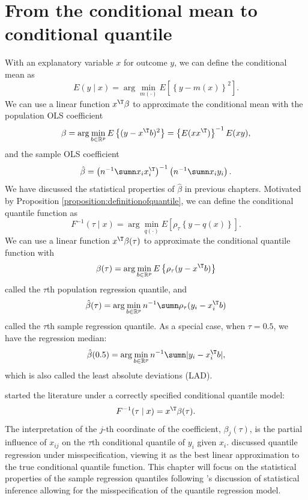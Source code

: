 \section{From the conditional mean to conditional quantile}

With an explanatory variable $x$ for outcome $y$, we can define
the conditional mean as
\[
E(y\mid x)=\arg\min_{m(\cdot)}E\left[\left\{ y-m(x)\right\} ^{2}\right].
\]
We can use a linear function $x^{\T}\beta$ to approximate the conditional
mean with the population OLS coefficient 
\[
\beta=\arg\min_{b \in \mathbb{R}^p  }E\left\{ (y-x^{\T}b)^{2}\right\} =\left\{ E(xx^{\T})\right\} ^{-1}E(xy),
\]
and the sample OLS coefficient
\[
\hat{\beta}=\left(n^{-1}\sumn x_{i}x_{i}^{\T}\right)^{-1}\left(n^{-1}\sumn x_{i}y_{i}\right).
\]
We have discussed the statistical properties of $\hat{\beta}$ in previous chapters.
Motivated by Proposition \ref{proposition:definitionofquantile}, we can
define the conditional quantile function as 
\[
F^{-1}(\tau\mid x)=\arg\min_{q(\cdot)}E\left[\rho_{\tau}\left\{ y-q(x)\right\} \right].
\]
We can use a linear function $x^{\T}\beta(\tau)$ to approximate the
conditional quantile function with
\[
\beta(\tau)=\arg\min_{b   \in \mathbb{R}^p  }E\left\{ \rho_{\tau}(y-x^{\T}b)\right\} 
\]
called the $\tau$th population regression quantile, and 
\begin{equation}
\hat{\beta}(\tau)=\arg\min_{b   \in \mathbb{R}^p }n^{-1}\sumn\rho_{\tau}(y_{i}-x_{i}^{\T}b)\label{eq:sample-regression-quantiles}
\end{equation}
called the $\tau$th sample regression quantile. 
As a special case, when $\tau = 0.5$, we have the regression median:
\[
\hat{\beta}(0.5)=\arg\min_{b  \in \mathbb{R}^p  } n^{-1}\sumn |y_{i}-x_{i}^{\T}b|,
\]
which is also called the least absolute deviations (LAD).


\citet{koenker1978regression} started the literature under a correctly specified conditional quantile model:
$$
F^{-1}(\tau\mid x) = x^{\T} \beta(\tau).
$$
The interpretation of the $j$-th coordinate of the coefficient, $\beta_j(\tau)$, is the partial influence of $x_{ij}$ on the $\tau$th conditional quantile of $y_i$ given $x_{i}$. 
\citet{angrist2006quantile} discussed quantile regression under misspecification, viewing it as the best linear approximation to the true conditional quantile function. This chapter will focus on the statistical properties of
the sample regression quantiles following \citet{angrist2006quantile}'s discussion of statistical inference allowing for the misspecification of the quantile regression model. 
 
